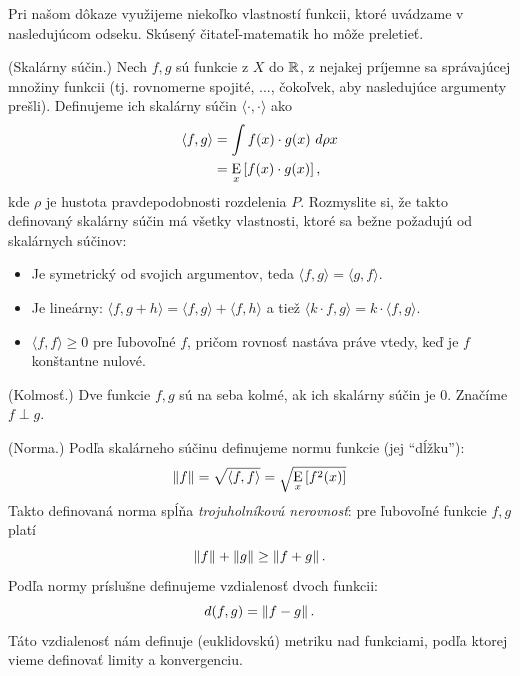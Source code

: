 Pri našom dôkaze využijeme niekoľko vlastností funkcii, ktoré uvádzame
v nasledujúcom odseku. Skúsený čitateľ-matematik ho môže preletieť.

\begin{definition}
  (Skalárny súčin.) Nech $f, g$ sú funkcie z $X$ do $\mathbb{R}$,
  z nejakej príjemne sa správajúcej množiny funkcii (tj. rovnomerne
  spojité, ..., čokoľvek, aby nasledujúce argumenty prešli). Definujeme
  ich skalárny súčin $\langle \cdot, \cdot \rangle$ ako
  \begin{align}
    \langle f, g \rangle
      &= \int f(x) \cdot g(x)\ d\rho x \\
      &= \operatorname*{\mathrm{E}}_x \left[ f(x) \cdot g(x) \right],
  \end{align}
  kde $\rho$ je hustota pravdepodobnosti rozdelenia $P$.
  Rozmyslite si, že takto definovaný skalárny súčin má všetky vlastnosti,
  ktoré sa bežne požadujú od skalárnych súčinov:
  \begin{itemize}
    \item Je symetrický od svojich argumentov, teda $\langle f, g \rangle = \langle g, f \rangle$.
    \item Je lineárny: $\langle f, g + h \rangle = \langle f, g \rangle + \langle f, h \rangle$
      a tiež $\langle k \cdot f, g \rangle = k \cdot \langle f, g \rangle$.
    \item $\langle f, f \rangle \geq 0$ pre ľubovoľné $f$, pričom rovnosť
      nastáva práve vtedy, keď je $f$ konštantne nulové.
  \end{itemize}
\end{definition}

\begin{definition}
  (Kolmosť.) Dve funkcie $f, g$ sú na seba kolmé, ak ich skalárny
  súčin je $0$. Značíme $f \perp g$.
\end{definition}

\begin{definition}
  (Norma.) Podľa skalárneho súčinu definujeme normu funkcie (jej ``dĺžku''):
  $$\left\lVert f\right\rVert = \sqrt{\langle f, f \rangle} = \sqrt{\operatorname*{\mathrm{E}}_x \left[ f^2(x) \right] }$$
  Takto definovaná norma spĺňa \emph{trojuholníkovú nerovnosť}: pre ľubovoľné
  funkcie $f, g$ platí
  $$\left\lVert f\right\rVert + \left\lVert g\right\rVert \geq \left\lVert f + g\right\rVert.$$
  Podľa normy príslušne definujeme vzdialenosť dvoch funkcii:
  $$d(f, g) = \left\lVert f - g\right\rVert.$$
  Táto vzdialenosť nám definuje (euklidovskú) metriku nad funkciami, podľa
  ktorej vieme definovať limity a konvergenciu.
\end{definition}

